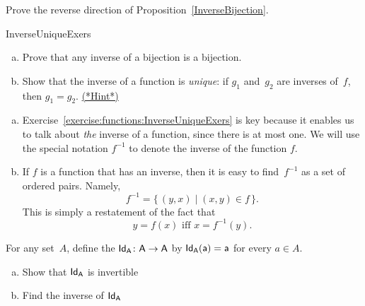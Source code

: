 \begin{exercise}{}
Prove the reverse direction of Proposition~\ref{InverseBijection}.
\end{exercise}

 \begin{exercise}{InverseUniqueExers} 
 \begin{enumerate}[(a)]
 \item \label{InverseUniqueExers-bij}
 Prove that any inverse of a bijection is a bijection.
 \item \label{InverseUniqueExers-unique}
 Show that the inverse of a function is \emph{unique}: if $g_1$ and~$g_2$ are inverses of~$f$, then $g_1 = g_2$.
\hyperref[sec:functions:hints]{(*Hint*)} 
 \end{enumerate}
 \end{exercise}

\begin{rem}
\begin{enumerate}[(a)]
\item
Exercise~\ref{exercise:functions:InverseUniqueExers} is key because it enables us to talk about \emph{the} inverse of a function, since there is at most one. We will use the special notation $f^{-1}$ to denote the inverse of the function $f$.
\item
If $f$ is a function that has an inverse, then it is easy to find~$f^{-1}$ as a set of ordered pairs. Namely, 
$$ f^{-1} = \{\, (y,x) \mid (x,y) \in f \,\} .$$
This is simply a restatement of the fact that
 $$y = f(x) \text{ iff } x = f^{-1}(y) .$$
\end{enumerate}
\end{rem}

\begin{defn}{}
For any set~$A$, define the  $\sf{Id}_A \colon A \to A$ by $\sf{Id}_A(a) = a$ for every $a \in A$.
\end{defn} 

\begin{exercise}{98}
\begin{enumerate}[(a)]
\item
Show that $\sf{Id}_A$ is invertible
\item
Find the inverse of $\sf{Id}_A$
\end{enumerate}
\end{exercise}

